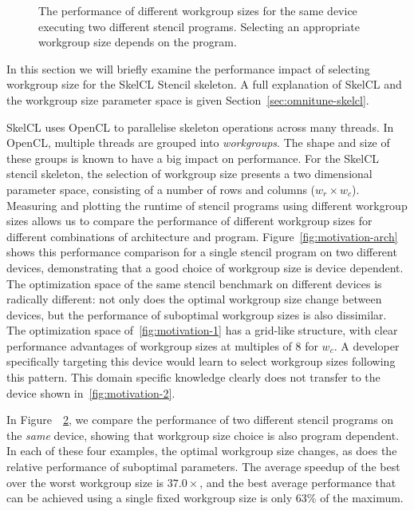 \begin{figure}
{\begin{minipage}{.48\textwidth}
\begin{subfigure}[h]{.48\columnwidth}
      \vspace{-1.5em} %
      \caption{}
      \label{fig:motivation-4}
    \end{subfigure}
    \caption{%
      The performance of different workgroup sizes for the same device
      executing two different stencil programs. Selecting an appropriate
      workgroup size depends on the program.%
    }
    \label{fig:motivation-prog}
  \end{minipage}%
}
\end{figure}

In this section we will briefly examine the performance impact of
selecting workgroup size for the SkelCL Stencil skeleton. A full
explanation of SkelCL and the workgroup size parameter space is given
Section~\ref{sec:omnitune-skelcl}.

SkelCL uses OpenCL to parallelise skeleton operations across many
threads. In OpenCL, multiple threads are grouped into
\emph{workgroups}. The shape and size of these groups is known to have
a big impact on performance. For the SkelCL stencil skeleton, the
selection of workgroup size presents a two dimensional parameter
space, consisting of a number of rows and columns ($w_r \times w_c$).
Measuring and plotting the runtime of stencil programs using different
workgroup sizes allows us to compare the performance of different
workgroup sizes for different combinations of architecture and
program. Figure~\ref{fig:motivation-arch} shows this performance
comparison for a single stencil program on two different devices,
demonstrating that a good choice of workgroup size is device
dependent. The optimization space of the same stencil benchmark on
different devices is radically different: not only does the optimal
workgroup size change between devices, but the performance of
suboptimal workgroup sizes is also dissimilar. The optimization space
of~\ref{fig:motivation-1} has a grid-like structure, with clear
performance advantages of workgroup sizes at multiples of 8 for
$w_c$. A developer specifically targeting this device would learn to
select workgroup sizes following this pattern. This domain specific
knowledge clearly does not transfer to the device shown
in~\ref{fig:motivation-2}.

In Figure~~\ref{fig:motivation-prog}, we compare the performance of
two different stencil programs on the \emph{same} device, showing that
workgroup size choice is also program dependent. In each of these four
examples, the optimal workgroup size changes, as does the relative
performance of suboptimal parameters. The average speedup of the best
over the worst workgroup size is $37.0\times$, and the best average
performance that can be achieved using a single fixed workgroup size
is only 63\% of the maximum.

